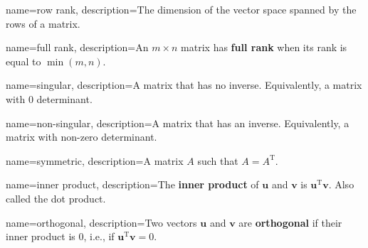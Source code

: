 {
        name=row rank,
        description={The dimension of the vector space spanned by the rows of a matrix.}
}

{
        name=full rank,
        description={An \(m\times n\) matrix has \textbf{full rank} when its rank is equal to \(\min\left(m, n\right)\).}
}

{
        name=singular,
        description={A matrix that has no inverse. Equivalently, a matrix with 0 determinant.}
}

{
        name=non-singular,
        description={A matrix that has an inverse. Equivalently, a matrix with non-zero determinant.}
}

{
        name=symmetric,
        description={A matrix \(A\) such that \(A=A^\text{T}\).}
}

{
        name=inner product,
        description={The \textbf{inner product} of \(\mathbf{u}\) and \(\mathbf{v}\) is \(\mathbf{u}^{\text{T}}\mathbf{v}\). Also called the dot product.}
}

{
        name=orthogonal,
        description={Two vectors \(\mathbf{u}\) and \(\mathbf{v}\) are \textbf{orthogonal} if their inner product is 0, i.e., if \(\mathbf{u}^{\text{T}}\mathbf{v}=0\).}
}

